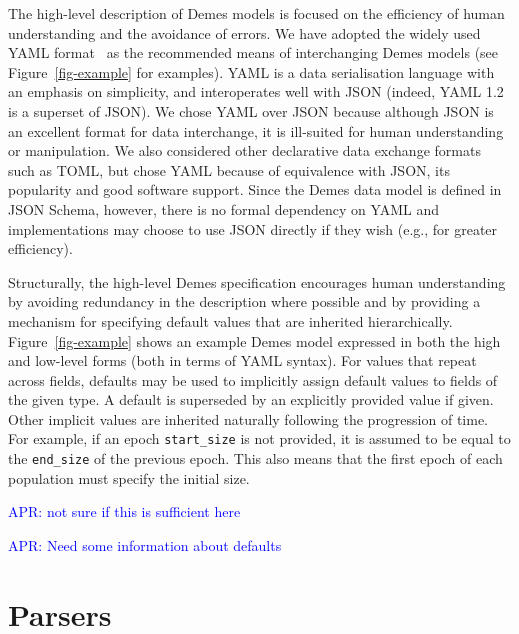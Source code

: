 \documentclass[11pt]{article}
\newcommand{\aprcomment}[1]{{\textcolor{blue}{APR: #1}}}
\begin{document}
The high-level description of Demes models is focused on the efficiency of
human understanding and the avoidance of errors. We have adopted the widely
used YAML format~\citep{ben2009yaml} as the recommended means of interchanging
Demes models (see Figure~\ref{fig-example} for examples). YAML is a data
serialisation language with an emphasis on simplicity, and interoperates well
with JSON (indeed, YAML 1.2 is a superset of JSON). We chose YAML over JSON
because although JSON is an excellent format for data interchange, it is
ill-suited for human understanding or manipulation. We also considered other
declarative data exchange formats such as TOML,
but chose YAML because of equivalence with JSON,
its popularity and good software support.
Since the Demes data model is defined in JSON Schema,
however, there is no formal dependency on YAML and implementations may choose
to use JSON directly if they wish (e.g., for greater efficiency).

Structurally, the high-level Demes specification encourages human understanding
by avoiding redundancy in the description where possible and by providing a
mechanism for specifying default values that are inherited hierarchically.
Figure~\ref{fig-example} shows an example Demes model expressed in both the
high and low-level forms (both in terms of YAML syntax). For values that repeat
across fields, defaults may be used to implicitly assign default values to
fields of the given type.  A default is superseded by an explicitly provided
value if given. Other implicit values are inherited naturally following the
progression of time. For example, if an epoch \texttt{start\_size} is not
provided, it is assumed to be equal to the \texttt{end\_size} of the previous
epoch. This also means that the first epoch of each population must specify the
initial size.

\aprcomment{not sure if this is sufficient here}

\aprcomment{Need some information about defaults}

\section{Parsers}\label{sec:appendix-parsers}
\end{document}
